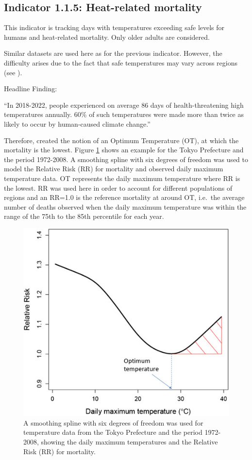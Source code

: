 \documentclass[
]{krantz}
\begin{document}
\subsection{Indicator 1.1.5: Heat-related mortality}\label{indicator-1.1.5-heat-related-mortality}

This indicator is tracking days with temperatures exceeding safe levels for humans and heat-related mortality. Only older adults are considered.

Similar datasets are used here as for the previous indicator. However, the difficulty arises due to the fact that safe temperatures may vary across regions (see \citet{Honda2014}).

Headline Finding:

``In 2018-2022, people experienced on average 86 days of health-threatening high temperatures annually. 60\% of such temperatures were made more than twice as likely to occur by human-caused climate change.''

Therefore, \citet{Honda2014} created the notion of an Optimum Temperature (OT), at which the mortality is the lowest. Figure \ref{fig:mortalityhondastrobl} shows an example for the Tokyo Prefecture and the period 1972-2008. A smoothing spline with six degrees of freedom was used to model the Relative Risk (RR) for mortality and observed daily maximum temperature data. OT represents the daily maximum temperature where RR is the lowest. RR was used here in order to account for different populations of regions and an RR=1.0 is the reference mortality at around OT, i.e.~the average number of deaths observed when the daily maximum temperature was within the range of the 75th to the 85th percentile for each year.

\begin{figure}
\includegraphics[width=1\linewidth]{work/08-lancet/figures/121_3} \caption{A smoothing spline with six degrees of freedom was used for temperature data from the Tokyo Prefecture and the period 1972-2008, showing the daily maximum temperatures and the Relative Risk (RR) for mortality.}\label{fig:mortalityhondastrobl}
\end{figure}
\end{document}
